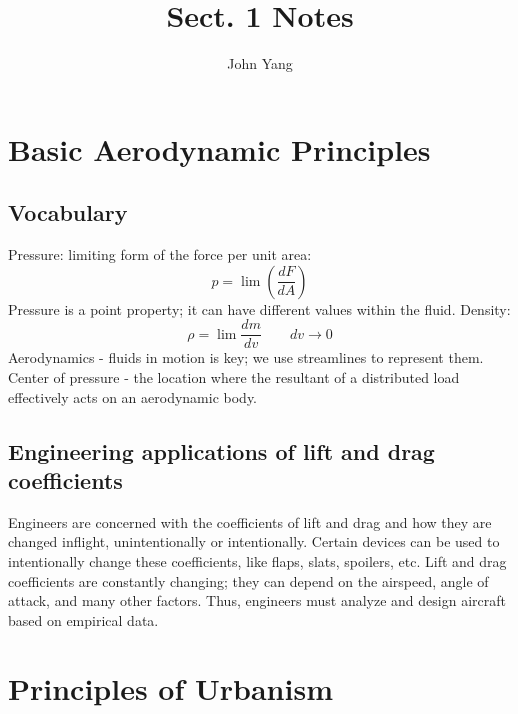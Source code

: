 \documentclass{article}
\title{Sect. 1 Notes} %
\author{John Yang}
\begin{document}
    \maketitle
    \tableofcontents
    \section{Basic Aerodynamic Principles}
    \subsection{Vocabulary}
    \begin{outline}
        \1 Pressure: limiting form of the force per unit area: \[p=\lim\left(\dfrac{dF}{dA}\right)\]
            \2 Pressure is a point property; it can have different values within the fluid. 
        \1 Density: \[\rho=\lim\dfrac{dm}{dv}\qquad dv\to0\]
        \1 Aerodynamics - fluids in motion is key; we use streamlines to represent them. 
        \1 Center of pressure - the location where the resultant of a distributed load effectively acts on an aerodynamic body. 

    \end{outline}
    \subsection{Engineering applications of lift and drag coefficients}
    \begin{outline}
        \1 Engineers are concerned with the coefficients of lift and drag and how they are changed inflight, unintentionally or intentionally. 
        \1 Certain devices can be used to intentionally change these coefficients, like flaps, slats, spoilers, etc. 
        \1 Lift and drag coefficients are constantly changing; they can depend on the airspeed, angle of attack, and many other factors. Thus, engineers must analyze and design aircraft based on empirical data. 

    \end{outline}
    \section{Principles of Urbanism}
\end{document}
